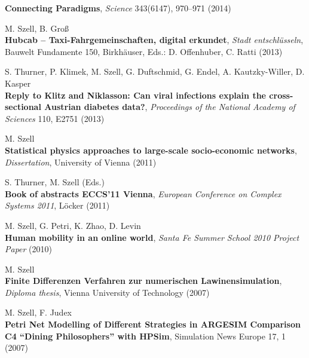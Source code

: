 \documentclass[10pt,a4paper]{article}
\renewenvironment{itemize}{
  \begin{list}{}{
    \setlength{\leftmargin}{1.5em}
    \setlength{\itemsep}{0.25em}
    \setlength{\parskip}{0pt}
    \setlength{\parsep}{0.25em}
  }
}{
  \end{list}
}
\begin{document}
\begin{itemize}
    \textbf{Connecting Paradigms}, \textit{Science} 343(6147), 970--971 (2014)
\item M. Szell, B. Gro{\ss}\\
    \textbf{Hubcab -- Taxi-Fahrgemeinschaften, digital erkundet}, \textit{Stadt entschl\"usseln}, Bauwelt Fundamente 150, Birkh\"auser, Eds.: D. Offenhuber, C. Ratti (2013)
\item S. Thurner, P. Klimek, M. Szell, G. Duftschmid, G. Endel, A. Kautzky-Willer, D. Kasper\\
    \textbf{Reply to Klitz and Niklasson: Can viral infections explain the cross-sectional Austrian diabetes data?}, \textit{Proceedings of the National Academy of Sciences} 110, E2751 (2013)
\item M. Szell\\
    \textbf{Statistical physics approaches to large-scale socio-economic networks}, \textit{Dissertation}, University of Vienna (2011)
\item S. Thurner, M. Szell (Eds.)\\
    \textbf{Book of abstracts ECCS{'}11 Vienna}, \textit{European Conference on Complex Systems 2011}, L\"ocker (2011)
\item M. Szell, G. Petri, K. Zhao, D. Levin\\
    \textbf{Human mobility in an online world}, \textit{Santa Fe Summer School 2010 Project Paper} (2010)
\item M. Szell\\
    \textbf{Finite Differenzen Verfahren zur numerischen Lawinensimulation}, \textit{Diploma thesis}, Vienna University of Technology (2007)
\item M. Szell, F. Judex\\
    \textbf{Petri Net Modelling of Different Strategies in ARGESIM Comparison C4 ``Dining Philosophers'' with HPSim}, Simulation News Europe 17, 1 (2007)
\end{itemize}
\end{document}

